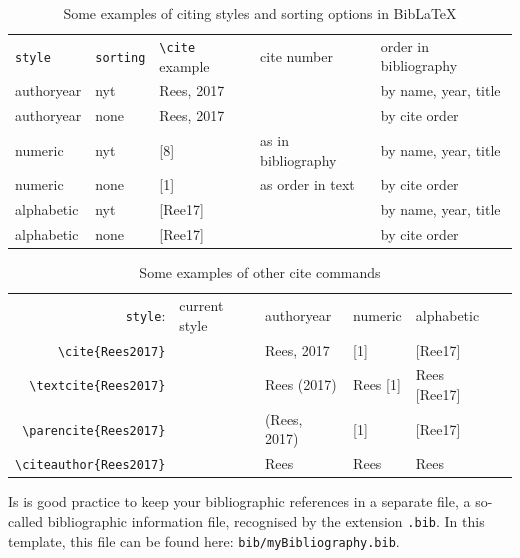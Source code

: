 \begin{table}\centering
    \caption{Some examples of citing styles and sorting options in BibLaTeX}\label{tab:biblatex}
        \begin{tabular}{lllll}
        \toprule
        \verb|style|& \verb|sorting| & \verb|\cite| example  & cite number         & order in bibliography  \\[+1.5ex]
        authoryear  & nyt            & Rees, 2017 &                     & by name, year, title \\
        authoryear  & none           & Rees, 2017 &                     & by cite order \\
        numeric     & nyt            & [8]        &  as in bibliography & by name, year, title \\
        numeric     & none           & [1]        &  as order in text   & by cite order  \\
        alphabetic  & nyt            & [Ree17]    &                     & by name, year, title \\
        alphabetic  & none           & [Ree17]    &                     & by cite order  \\
        \bottomrule
        \end{tabular}
\end{table}

\begin{table}\centering
    \caption{Some examples of other cite commands}\label{tab:cites}
        \begin{tabular}{rlllll}
        \toprule
            \verb|style|: 	            &	current	style           &	authoryear	&	numeric	    &	alphabetic	\\[+1.5ex]
            \verb|\cite{Rees2017}| 	    &	\cite{Rees2017}	        &	Rees, 2017	&	[1]	        &	[Ree17]	    \\
            \verb|\textcite{Rees2017}| 	&	\textcite{Rees2017}	    &	Rees (2017)	&	Rees [1]	&	Rees [Ree17]\\
            \verb|\parencite{Rees2017}| &	\parencite{Rees2017}	&	(Rees, 2017)&	[1]	        &	[Ree17]	    \\
            \verb|\citeauthor{Rees2017}|&	\citeauthor{Rees2017}	&	Rees	    &	Rees	    &	Rees	    \\
        \bottomrule
        \end{tabular}
\end{table}

Is is good practice to keep your bibliographic references in a separate file, a so-called bibliographic information file, recognised by the extension \verb|.bib|. In this template, this file can be found here: \verb|bib/myBibliography.bib|.


